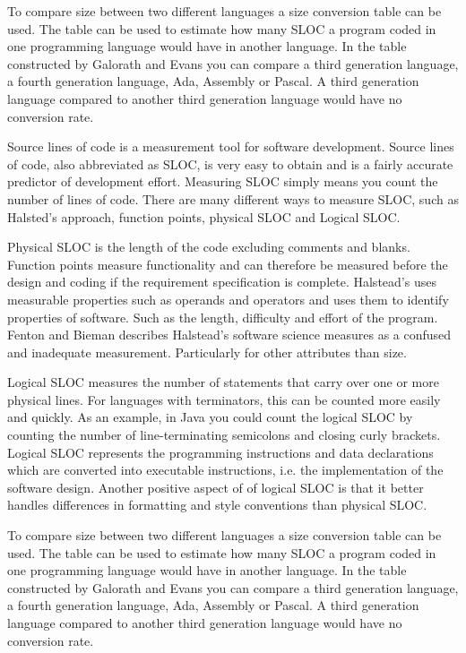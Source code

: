 To compare size between two different languages a size conversion table can be used. The table can be used to estimate how many SLOC a program coded in one programming language would have in another language. In the table constructed by Galorath and Evans you can compare a third generation language, a fourth generation language, Ada, Assembly or Pascal\cite[p.~163]{galorath2006}. A third generation language compared to another third generation language would have no conversion rate. 

Source lines of code is a measurement tool for software development. Source lines of code, also abbreviated as SLOC, is very easy to obtain and is a fairly accurate predictor of development effort\cite[p.~63]{galorath2006}. Measuring SLOC simply means you count the number of lines of code. There are many different ways to measure SLOC, such as Halsted’s approach, function points, physical SLOC and Logical SLOC. 

Physical SLOC is the length of the code excluding comments and blanks. Function points measure functionality and can therefore be measured before the design and coding if the requirement specification is complete\cite[p.~187]{galorath2006}. Halstead’s uses measurable properties such as operands and operators and uses them to identify properties of software. Such as the length, difficulty and effort of the program. Fenton and Bieman describes Halstead’s software science measures as a confused and inadequate measurement. Particularly for other attributes than size\cite[p.~345]{fenton2015}.

Logical SLOC measures the number of statements that carry over one or more physical lines.  For languages with terminators, this can be counted more easily and quickly. As an example, in Java you could count the logical SLOC by counting the number of line-terminating semicolons and closing curly brackets. Logical SLOC represents the programming instructions and data declarations which are converted into executable instructions, i.e. the implementation of the software design. Another positive aspect of of logical SLOC is that it better handles differences in formatting and style conventions than physical SLOC\cite[p.~155]{galorath2006}.

To compare size between two different languages a size conversion table can be used. The table can be used to estimate how many SLOC a program coded in one programming language would have in another language. In the table constructed by Galorath and Evans you can compare a third generation language, a fourth generation language, Ada, Assembly or Pascal\cite[p.~163]{galorath2006}. A third generation language compared to another third generation language would have no conversion rate. 

